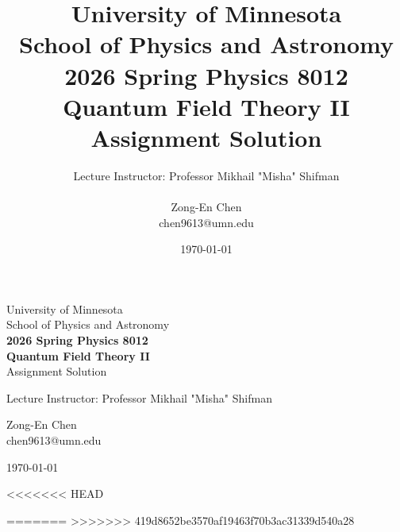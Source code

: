 \documentclass[12pt,letterpaper]{article}
\title{University of Minnesota\\
School of Physics and Astronomy\\
\textbf{2026 Spring Physics 8012\\ Quantum Field Theory II}\\ 
Assignment Solution}
\author{Lecture Instructor: Professor Mikhail "Misha" Shifman \\ \\
        Zong-En Chen\\ chen9613@umn.edu}
\date{\today}
\begin{document}
\onehalfspacing
\begin{titlepage}
    \centering
    \vspace*{\fill} %
    {\LARGE University of Minnesota\\
    School of Physics and Astronomy\\[1em]
    \textbf{2026 Spring Physics 8012\\ Quantum Field Theory II}\\ 
    Assignment Solution \par}
    \vspace{2cm}
    {\large Lecture Instructor: Professor Mikhail "Misha" Shifman \par}
    \vspace{1cm}
    {\large Zong-En Chen\\ chen9613@umn.edu \par}
    \vspace{2cm}
    {\large \today \par}
    \vspace*{\fill} %
\end{titlepage}

<<<<<<< HEAD











=======
%
%
%
%
%
%
%
%
%
%
%
>>>>>>> 419d8652be3570af19463f70b3ac31339d540a28

\end{document}

